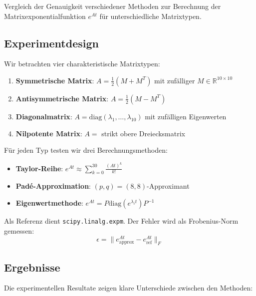 ﻿\documentclass[a4paper,12pt]{report}
\theoremstyle{definition}
\begin{document}
	Vergleich der Genauigkeit verschiedener Methoden zur Berechnung der Matrixexponentialfunktion $e^{At}$ für unterschiedliche Matrixtypen.
	
	\subsection{Experimentdesign}
	
	Wir betrachten vier charakteristische Matrixtypen:
	
	\begin{enumerate}
		\item \textbf{Symmetrische Matrix}: $A = \frac{1}{2}(M + M^T)$ mit zufälliger $M \in \mathbb{R}^{10 \times 10}$
		\item \textbf{Antisymmetrische Matrix}: $A = \frac{1}{2}(M - M^T)$
		\item \textbf{Diagonalmatrix}: $A = \text{diag}(\lambda_1, \ldots, \lambda_{10})$ mit zufälligen Eigenwerten
		\item \textbf{Nilpotente Matrix}: $A = $ strikt obere Dreiecksmatrix
	\end{enumerate}
	
	Für jeden Typ testen wir drei Berechnungsmethoden:
	
	\begin{itemize}
		\item \textbf{Taylor-Reihe}: $e^{At} \approx \sum_{k=0}^{30} \frac{(At)^k}{k!}$
		\item \textbf{Padé-Approximation}: $(p,q) = (8,8)$-Approximant
		\item \textbf{Eigenwertmethode}: $e^{At} = P \text{diag}(e^{\lambda_i t}) P^{-1}$
	\end{itemize}
	
	Als Referenz dient \texttt{scipy.linalg.expm}. Der Fehler wird als Frobenius-Norm gemessen:
	\[
	\epsilon = \|e^{At}_{\text{approx}} - e^{At}_{\text{ref}}\|_F
	\]
	
	\subsection{Ergebnisse}
	
	Die experimentellen Resultate zeigen klare Unterschiede zwischen den Methoden:
	
\end{document}
